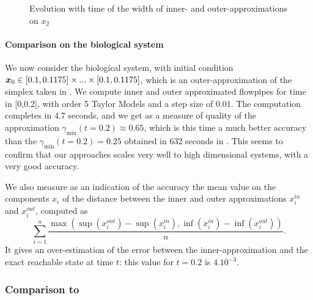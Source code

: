 \documentclass{sig-alternate-05-2015}
\begin{document}
\begin{figure}[htbp]
\begin{center}
\end{center}
\caption{Evolution with time of the width of inner- and outer-approximations on $x_2$ \label{ex:width_sriram_bruss2} }
\end{figure}


\paragraph{Comparison on the biological system}
We now consider the biological system, with initial condition $\x_0 \in [0.1,0.1175] \times...\times [0.1,0.1175]$, which is an outer-approximation
of the simplex taken in  \cite{Underapproxflowpipes}. We compute inner and outer approximated flowpipes for time in [0,0.2], 
with order 5 Taylor Models and a step size of 0.01. The computation completes in 4.7 seconds, and we get as a measure of quality of the approximation 
$\gamma_{\min}(t=0.2) \approx 0.65$, which is this time a much better accuracy than the $\gamma_{\min}(t=0.2) = 0.25$ obtained in 632 seconds in  \cite{Underapproxflowpipes}. 
This seems to confirm that our approaches scales very well to high dimensional systems, with a very good accuracy. 

We also measure as an indication of the accuracy the mean value on the components $x_i$ of the distance between the inner and outer approximations $x_i^{in}$ and $x_i^{out}$,
computed as $$\sum_{i=1}^n \frac{\max(\sup(x_i^{out})-\sup(x_i^{in}),\inf(x_i^{in})- \inf(x_i^{out}))}{n}.$$
It gives an over-estimation of the error between the inner-approximation and the exact reachable state at time $t$: this value for $t=0.2$ is $4.10^{-3}$.


\subsubsection{Comparison to \cite{underapprox16}}
\end{document}
